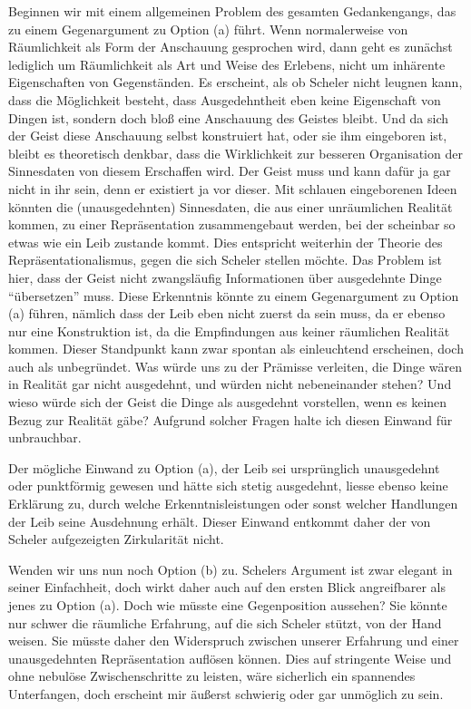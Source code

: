 \documentclass[a4paper, 12pt]{article}
\begin{document}
\begin{onehalfspace}
Beginnen wir mit einem allgemeinen Problem des gesamten Gedankengangs, das zu einem Gegenargument zu Option (a) führt. Wenn normalerweise von Räumlichkeit als Form der Anschauung gesprochen wird, dann geht es zunächst lediglich um Räumlichkeit als Art und Weise des Erlebens, nicht um inhärente Eigenschaften von Gegenständen. Es erscheint, als ob Scheler nicht leugnen kann, dass die Möglichkeit besteht, dass Ausgedehntheit eben keine Eigenschaft von Dingen ist, sondern doch bloß eine Anschauung des Geistes bleibt. Und da sich der Geist diese Anschauung selbst konstruiert hat, oder sie ihm eingeboren ist, bleibt es theoretisch denkbar, dass die Wirklichkeit zur besseren Organisation der Sinnesdaten von diesem Erschaffen wird. Der Geist muss und kann dafür ja gar nicht in ihr sein, denn er existiert ja vor dieser. Mit schlauen eingeborenen Ideen könnten die (unausgedehnten) Sinnesdaten, die aus einer unräumlichen Realität kommen, zu einer Repräsentation zusammengebaut werden, bei der scheinbar so etwas wie ein Leib zustande kommt. Dies entspricht weiterhin der Theorie des Repräsentationalismus, gegen die sich Scheler stellen möchte. Das Problem ist hier, dass der Geist nicht zwangsläufig Informationen über ausgedehnte Dinge "`übersetzen"' muss. Diese Erkenntnis könnte zu einem Gegenargument zu Option (a) führen, nämlich dass der Leib eben nicht zuerst da sein muss, da er ebenso nur eine Konstruktion ist, da die Empfindungen aus keiner räumlichen Realität kommen. Dieser Standpunkt kann zwar spontan als einleuchtend erscheinen, doch auch als unbegründet. Was würde uns zu der Prämisse verleiten, die Dinge wären in Realität gar nicht ausgedehnt, und würden nicht nebeneinander stehen? Und wieso würde sich der Geist die Dinge als ausgedehnt vorstellen, wenn es keinen Bezug zur Realität gäbe? Aufgrund solcher Fragen halte ich diesen Einwand für unbrauchbar.

Der mögliche Einwand zu Option (a), der Leib sei ursprünglich unausgedehnt oder punktförmig gewesen und hätte sich stetig ausgedehnt, liesse ebenso keine Erklärung zu, durch welche Erkenntnisleistungen oder sonst welcher Handlungen der Leib seine Ausdehnung erhält. Dieser Einwand entkommt daher der von Scheler aufgezeigten Zirkularität nicht.

Wenden wir uns nun noch Option (b) zu. Schelers Argument ist zwar elegant in seiner Einfachheit, doch wirkt daher auch auf den ersten Blick angreifbarer als jenes zu Option (a). Doch wie müsste eine Gegenposition aussehen? Sie könnte nur schwer die räumliche Erfahrung, auf die sich Scheler stützt, von der Hand weisen. Sie müsste daher den Widerspruch zwischen unserer Erfahrung und einer unausgedehnten Repräsentation auflösen können. Dies auf stringente Weise und ohne nebulöse Zwischenschritte zu leisten, wäre sicherlich ein spannendes Unterfangen, doch erscheint mir äußerst schwierig oder gar unmöglich zu sein.


\end{onehalfspace}
\end{document}

